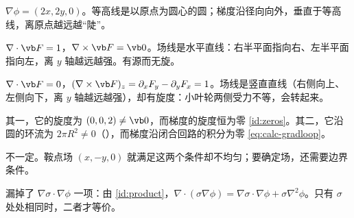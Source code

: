 \begin{answers}
\item $\nabla\phi=(2x,2y,0)$。等高线是以原点为圆心的圆；梯度沿径向向外，垂直于等高线，离原点越远越“陡”。
\item $\nabla\cdot\vb F=1$，$\nabla\times\vb F=\vb 0$。场线是水平直线：右半平面指向右、左半平面指向左，离 $y$ 轴越远越强。有源而无旋。
\item $\nabla\cdot\vb F=0$，$(\nabla\times\vb F)_z=\partial_xF_y-\partial_yF_x=1$。场线是竖直直线（右侧向上、左侧向下，离 $y$ 轴越远越强），却有旋度：小叶轮两侧受力不等，会转起来。
\item 其一，它的旋度为 $(0,0,2)\neq\vb 0$，而梯度的旋度恒为零 \eqref{id:zeros}。其二，它沿圆的环流为 $2\pi R^2\neq0$（），而梯度沿闭合回路的积分为零 \eqref{eq:calc-gradloop}。
\item 不一定。鞍点场 $(x,-y,0)$ 就满足这两个条件却不均匀；要确定场，还需要边界条件。
\item 漏掉了 $\nabla\sigma\cdot\nabla\phi$ 一项：由 \eqref{id:product}，$\nabla\cdot(\sigma\nabla\phi)=\nabla\sigma\cdot\nabla\phi+\sigma\nabla^2\phi$。只有 $\sigma$ 处处相同时，二者才等价。
\end{answers}

